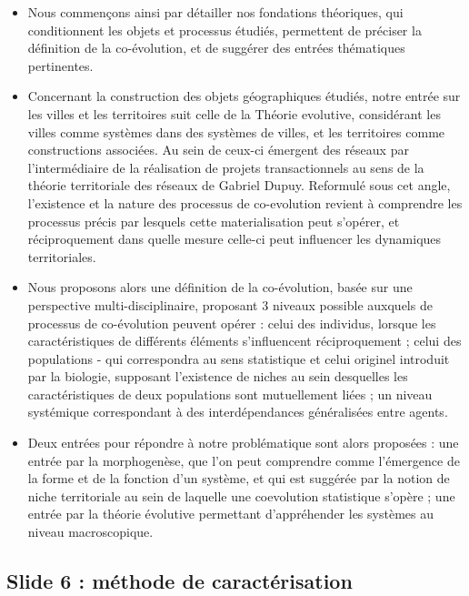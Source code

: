 \documentclass[11pt]{article}
\begin{document}
\begin{itemize}
	\item Nous commençons ainsi par détailler nos fondations théoriques, qui conditionnent les objets et processus étudiés, permettent de préciser la définition de la co-évolution, et de suggérer des entrées thématiques pertinentes.
	\item Concernant la construction des objets géographiques étudiés, notre entrée sur les villes et les territoires suit celle de la Théorie evolutive, considérant les villes comme systèmes dans des systèmes de villes, et les territoires comme constructions associées. Au sein de ceux-ci émergent des réseaux par l'intermédiaire de la réalisation de projets transactionnels au sens de la théorie territoriale des réseaux de Gabriel Dupuy. Reformulé sous cet angle, l'existence et la nature des processus de co-evolution revient à comprendre les processus précis par lesquels cette materialisation peut s'opérer, et réciproquement dans quelle mesure celle-ci peut influencer les dynamiques territoriales.
	\item Nous proposons alors une définition de la co-évolution, basée sur une perspective multi-disciplinaire, proposant 3 niveaux possible auxquels de processus de co-évolution peuvent opérer : celui des individus, lorsque les caractéristiques de différents éléments s'influencent réciproquement ; celui des populations - qui correspondra au sens statistique et celui originel introduit par la biologie, supposant l'existence de niches au sein desquelles les caractéristiques de deux populations sont mutuellement liées ; un niveau systémique correspondant à des interdépendances généralisées entre agents.
	\item Deux entrées pour répondre à notre problématique sont alors proposées : une entrée par la morphogenèse, que l'on peut comprendre comme l'émergence de la forme et de la fonction d'un système, et qui est suggérée par la notion de niche territoriale au sein de laquelle une coevolution statistique s'opère ; une entrée par la théorie évolutive permettant d'appréhender les systèmes au niveau macroscopique.
\end{itemize}




\subsection*{Slide 6 : méthode de caractérisation}
\end{document}
